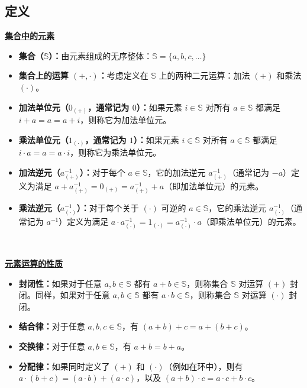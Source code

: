 
\subsection{定义}
\label{subsec:group-def}


\begin{tcolorbox}[title={\textbf{\tboxdef{\ref*{subsec:group-def}} 群}}]
\noindent \textbf{\underline{集合中的元素}}
\begin{itemize}
\item \textbf{集合（$\mathbb{S}$）：}由元素组成的无序整体：$\mathbb{S} = \{a, b, c, \ldots\}$
\item \textbf{集合上的运算 $\bm{(+, \cdot)}$：}考虑定义在 $\mathbb{S}$ 上的两种二元运算：加法 $(+)$ 和乘法 $(\cdot)$。
\item \textbf{加法单位元（$0_{(+)}$，通常记为 $0$）：}如果元素 $i \in \mathbb{S}$ 对所有 $a \in \mathbb{S}$ 都满足 $i + a = a = a + i$，则称它为加法单位元。
\item \textbf{乘法单位元（$1_{(\cdot)}$，通常记为 $1$）：}如果元素 $i \in \mathbb{S}$ 对所有 $a \in \mathbb{S}$ 都满足 $i \cdot a = a = a \cdot i$，则称它为乘法单位元。
\item \textbf{加法逆元（$a^{-1}_{(+)}$）：}对于每个 $a \in \mathbb{S}$，它的加法逆元 $a^{-1}_{(+)}$（通常记为 $-a$）定义为满足 $a + a^{-1}_{(+)} = 0_{(+)} = a^{-1}_{(+)} + a$（即加法单位元）的元素。
\item \textbf{乘法逆元（$a^{-1}_{(\cdot)}$）：}对于每个关于 $(\cdot)$ 可逆的 $a \in \mathbb{S}$，它的乘法逆元 $a^{-1}_{(\cdot)}$（通常记为 $a^{-1}$）定义为满足 $a \cdot a^{-1}_{(\cdot)} = 1_{(\cdot)} = a^{-1}_{(\cdot)} \cdot a$（即乘法单位元）的元素。
\end{itemize}

$ $

\noindent \textbf{\underline{元素运算的性质}}
\begin{itemize}
\item \textbf{封闭性：}如果对于任意 $a, b \in \mathbb{S}$ 都有 $a + b \in \mathbb{S}$，则称集合 $\mathbb{S}$ 对运算 $(+)$ 封闭。同样，如果对于任意 $a, b \in \mathbb{S}$ 都有 $a \cdot b \in \mathbb{S}$，则称集合 $\mathbb{S}$ 对运算 $(\cdot)$ 封闭。
\item \textbf{结合律：}对于任意 $a,b,c \in \mathbb{S}$，有 $(a + b) + c = a + (b + c)$。
\item \textbf{交换律：}对于任意 $a,b \in \mathbb{S}$，有 $a + b = b + a$。
\item \textbf{分配律：}如果同时定义了 $(+)$ 和 $(\cdot)$（例如在环中），则有 $a \cdot (b + c) = (a \cdot b) + (a \cdot c)$，以及 $(a + b) \cdot c = a\cdot c + b\cdot c$。
\end{itemize}



\end{tcolorbox}
